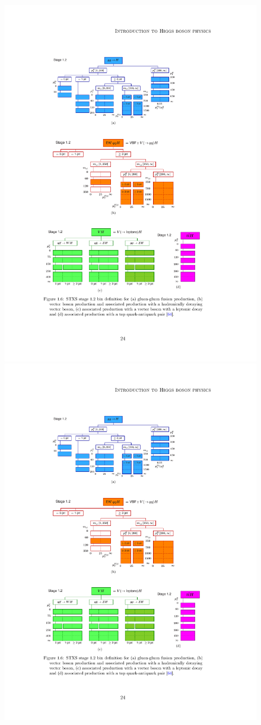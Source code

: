 \begin{figure}[htbp]
    \centering
    \includegraphics[width=0.6\linewidth]{images/STXSbins_ggF}\\
    \includegraphics[width=0.6\linewidth]{images/STXSbins_VBF_VqqH}\\

\end{figure}
